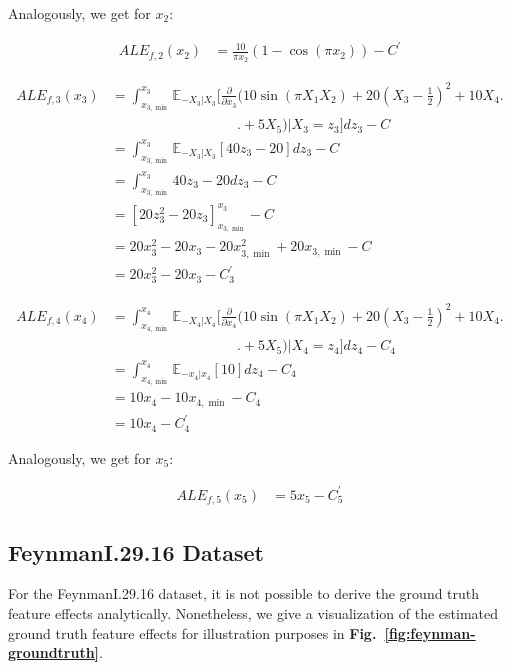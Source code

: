 \documentclass[runningheads]{llncs}
\begin{document}
\newpage
\noindent Analogously, we get for $x_2$:

\begin{align*}
    ALE_{f,2}(x_2) &= \frac{10}{\pi x_2}\left(1 - \cos(\pi x_2)\right) - C^\prime
\end{align*}

\begin{align*}
    ALE_{f,3}(x_3) &= \int_{x_{3,\min}}^{x_3} \mathbb{E}_{-X_3|X_3}\Bigg[\frac{\partial}{\partial x_3}(10\sin(\pi X_1X_2) + 20(X_3-\frac{1}{2})^2 + 10X_4 \Bigg. \\
    &\qquad\qquad\qquad\qquad\quad \Bigg. + 5X_5) \big|X_3=z_3\Bigg]dz_3 - C \\
    &= \int_{x_{3,\min}}^{x_3} \mathbb{E}_{-X_3|X_3}\left[40z_3-20\right]dz_3 - C \\
    &= \int_{x_{3,\min}}^{x_3} 40z_3-20dz_3 - C \\
    &= \left[20z_3^2 - 20z_3\right]_{x_{3,\min}}^{x_3} - C \\
    &= 20x_3^2 - 20x_3 - 20x_{3,\min}^2 + 20x_{3,\min} - C \\
    &= 20x_3^2 - 20x_3 - C_3^\prime
\end{align*}
    
\begin{align*}
    ALE_{f,4}(x_4) &= \int_{x_{4,\min}}^{x_4} \mathbb{E}_{-X_4|X_4}\Bigg[\frac{\partial}{\partial x_4}(10\sin(\pi X_1X_2) + 20(X_3-\frac{1}{2})^2 + 10X_4 \Bigg. \\
    &\qquad\qquad\qquad\qquad\quad \Bigg. {} + 5X_5) \big|X_4=z_4\Bigg]dz_4 - C_4 \\
    &= \int_{x_{4,\min}}^{x_4} \mathbb{E}_{-x_4|x_4}\left[10\right]dz_4 - C_4 \\
    &= 10x_4 - 10x_{4,\min} - C_4 \\
    &= 10x_4 - C_4^\prime
\end{align*}

\noindent Analogously, we get for $x_5$:
    
\begin{align*}
    ALE_{f,5}(x_5) &= 5x_5 - C_5^\prime
\end{align*}

\newpage
\subsection{FeynmanI.29.16 Dataset}

For the FeynmanI.29.16 dataset, it is not possible to derive the ground truth
feature effects analytically. Nonetheless, we give a visualization of the
estimated ground truth feature effects for illustration purposes in
\textbf{Fig.~\ref{fig:feynman-groundtruth}}.
\end{document}
